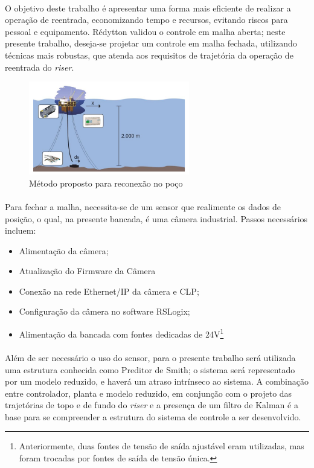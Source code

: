 \paragraph{} O objetivo deste trabalho é apresentar uma forma mais eficiente de realizar a operação de reentrada, economizando tempo e recursos, evitando riscos para pessoal e equipamento. Rédytton \cite{redytton} validou o controle em malha aberta; neste presente trabalho, deseja-se projetar um controle em malha fechada, utilizando técnicas mais robustas, que atenda aos requisitos de trajetória da operação de reentrada do \textit{riser}.

\begin{figure}[ht!]
\centering
  \includegraphics[width=7cm]{figs/introducao/posicionamentoProposto}
  \caption{Método proposto para reconexão no poço \cite{redytton} \label{posicionamentoProposto}}
\end{figure}

\paragraph{} Para fechar a malha, necessita-se de um sensor que realimente os dados de posição, o qual, na presente bancada, é uma câmera industrial. Passos necessários incluem: \begin{itemize}
	\item Alimentação da câmera;
	\item Atualização do Firmware da Câmera
	\item Conexão na rede Ethernet/IP da câmera e CLP;
	\item Configuração da câmera no software RSLogix;
	\item Alimentação da bancada com fontes dedicadas de 24V\footnote{Anteriormente, duas fontes de tensão de saída ajustável eram utilizadas, mas foram trocadas por fontes de saída de tensão única.}
\end{itemize}

\paragraph{} Além de ser necessário o uso do sensor, para o presente trabalho será utilizada uma estrutura conhecida como Preditor de Smith; o sistema será representado por um modelo reduzido, e haverá um atraso intrínseco ao sistema. A combinação entre controlador, planta e modelo reduzido, em conjunção com o projeto das trajetórias de topo e de fundo do \textit{riser} e a presença de um filtro de Kalman é a base para se compreender a estrutura do sistema de controle a ser desenvolvido.
